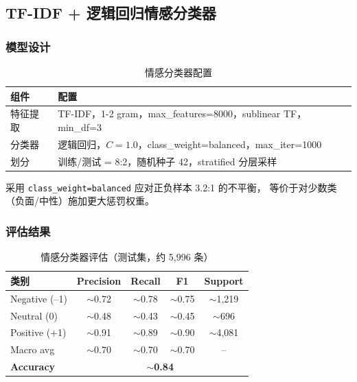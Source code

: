\documentclass[12pt, a4paper]{article}
\begin{document}
\subsection{TF-IDF + 逻辑回归情感分类器}

\subsubsection{模型设计}

\begin{table}[H]
\centering
\caption{情感分类器配置}
\label{tab:classifier}
\begin{tabular}{ll}
\toprule
\textbf{组件} & \textbf{配置} \\
\midrule
特征提取 & TF-IDF，1-2 gram，max\_features=8000，sublinear TF，min\_df=3 \\
分类器 & 逻辑回归，$C=1.0$，class\_weight=balanced，max\_iter=1000 \\
划分 & 训练/测试 = 8:2，随机种子 42，stratified 分层采样 \\
\bottomrule
\end{tabular}
\end{table}

采用 \texttt{class\_weight=balanced} 应对正负样本 3.2:1 的不平衡，
等价于对少数类（负面/中性）施加更大惩罚权重。

\subsubsection{评估结果}

\begin{table}[H]
\centering
\caption{情感分类器评估（测试集，约 5,996 条）}
\label{tab:clf_result}
\begin{tabular}{lcccc}
\toprule
\textbf{类别} & \textbf{Precision} & \textbf{Recall} & \textbf{F1} & \textbf{Support} \\
\midrule
Negative (--1) & $\sim$0.72 & $\sim$0.78 & $\sim$0.75 & $\sim$1,219 \\
Neutral (0)    & $\sim$0.48 & $\sim$0.43 & $\sim$0.45 & $\sim$696  \\
Positive (+1)  & $\sim$0.91 & $\sim$0.89 & $\sim$0.90 & $\sim$4,081 \\
\midrule
Macro avg      & $\sim$0.70 & $\sim$0.70 & $\sim$0.70 & --          \\
\textbf{Accuracy} & \multicolumn{4}{c}{$\sim$\textbf{0.84}} \\
\bottomrule
\end{tabular}
\end{table}
\end{document}
